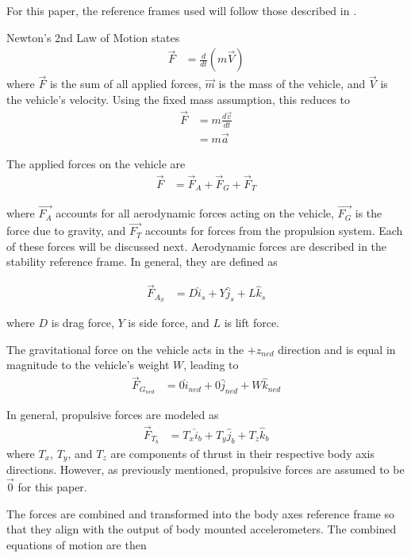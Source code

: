 \documentclass[]{aiaa-tc}%
\begin{document}
For this paper, the reference frames used will follow those described in \cite{klein2006aircraft}.

\label{sys-desc}
Newton's 2nd Law of Motion states
\begin{align}
\vec{F} &= \frac{d}{dt}(m\vec{V})
\end{align}
where $\vec{F}$ is the sum of all applied forces, $\vec{m}$ is the mass of the vehicle, and $\vec{V}$ is the vehicle's velocity. Using the fixed mass assumption, this reduces to 
\begin{align}
\vec{F} &= m\frac{d\vec{v}}{dt}\\
&= m\vec{a}
\end{align}

The applied forces on the vehicle are 
\begin{align}
\vec{F} &= \vec{F}_{A}+\vec{F}_{G}+\vec{F}_{T}
\end{align}

where $\vec{F_{A}}$ accounts for all aerodynamic forces acting on the vehicle, $\vec{F_{G}}$ is the force due to gravity, and $\vec{F_{T}}$ accounts for forces from the propulsion system. Each of these forces will be discussed next.
Aerodynamic forces are described in the stability reference frame. In general, they are defined as

\begin{align}
\vec{F}_{A_S} &= D \hat{i}_s+Y \hat{j}_s+L \hat{k}_s
\end{align}

where $D$ is drag force, $Y$ is side force, and $L$ is lift force. 

The gravitational force on the vehicle acts in the $+z_{ned}$ direction and is equal in magnitude to the vehicle's weight $W$, leading to
\begin{align}
\vec{F}_{G_{ned}} &= 0\hat{i}_{ned}+0\hat{j}_{ned}+W\hat{k}_{ned}
\end{align}

In general, propulsive forces are modeled as
\begin{align}
\vec{F}_{T_b} &= T_x \hat{i}_b+T_y \hat{j}_b +T_z \hat{k}_b
\end{align}
where $T_x$, $T_y$, and $T_z$ are components of thrust in their respective body axis directions. However, as previously mentioned, propulsive forces are assumed to be $\vec{0}$ for this paper.

The forces are combined and transformed into the body axes reference frame so that they align with the output of body mounted accelerometers. The combined equations of motion are then
\end{document}
